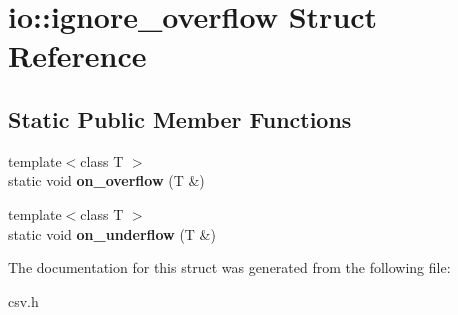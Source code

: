 \section{io\+:\+:ignore\+\_\+overflow Struct Reference}
\label{structio_1_1ignore__overflow}
\subsection*{Static Public Member Functions}
\begin{DoxyCompactItemize}
\item 
{\footnotesize template$<$class T $>$ }\\static void {\bfseries on\+\_\+overflow} (T \&)\label{structio_1_1ignore__overflow_aed3e5026cfa7157ea9270ae377d1026b}

\item 
{\footnotesize template$<$class T $>$ }\\static void {\bfseries on\+\_\+underflow} (T \&)\label{structio_1_1ignore__overflow_aece692f7a20933149ec99aa1f97458ad}

\end{DoxyCompactItemize}


The documentation for this struct was generated from the following file\+:\begin{DoxyCompactItemize}
\item 
csv.\+h\end{DoxyCompactItemize}
